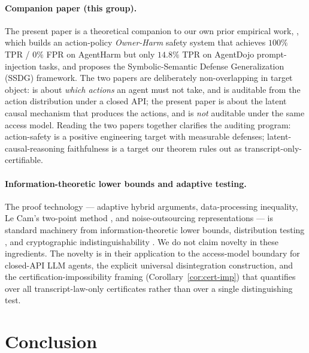 \documentclass{article}
\theoremstyle{plain}
\theoremstyle{definition}
\theoremstyle{remark}
\begin{document}
\paragraph{Companion paper (this group).}
The present paper is a theoretical companion to our own prior empirical
work, \citet{zhang2026ownerharm}, which builds an action-policy
\emph{Owner-Harm} safety system that achieves $100\%$ TPR / $0\%$ FPR on
AgentHarm \citep{andriushchenko2025agentharm} but only $14.8\%$ TPR on
AgentDojo prompt-injection tasks, and proposes the Symbolic-Semantic
Defense Generalization (SSDG) framework. The two papers are deliberately
non-overlapping in target object: \citet{zhang2026ownerharm} is about
\emph{which actions} an agent must not take, and is auditable from the
action distribution under a closed API; the present paper is about the
latent causal mechanism that produces the actions, and is \emph{not}
auditable under the same access model. Reading the two papers together
clarifies the auditing program: action-safety is a positive engineering
target with measurable defenses; latent-causal-reasoning faithfulness is
a target our theorem rules out as transcript-only-certifiable.

\paragraph{Information-theoretic lower bounds and adaptive testing.}
The proof technology --- adaptive hybrid arguments, data-processing
inequality, Le Cam's two-point method \citep{lecam1986,tsybakov2009,
coverthomas2006}, and noise-outsourcing representations
\citep{kallenberg2021} --- is standard machinery from
information-theoretic lower bounds, distribution testing
\citep{canonne2020survey}, and cryptographic indistinguishability
\citep{goldreich2001foundations}. We do not claim novelty in these
ingredients. The novelty is in their application to the access-model
boundary for closed-API LLM agents, the explicit universal disintegration
construction, and the certification-impossibility framing
(Corollary~\ref{cor:cert-imp}) that quantifies over all transcript-law-only
certificates rather than over a single distinguishing test.

\section{Conclusion}\label{sec:conclusion}
\end{document}
